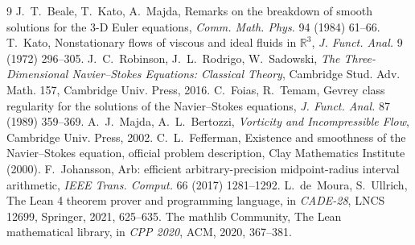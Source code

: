 \documentclass[11pt]{article}
\newcommand{\R}{\mathbb{R}}
\theoremstyle{remark}
\begin{document}
\begin{thebibliography}{9}
 J.~T.~Beale, T.~Kato, A.~Majda, Remarks on the breakdown of smooth solutions for the 3-D Euler
equations, \emph{Comm. Math. Phys.} 94 (1984) 61--66.
 T.~Kato, Nonstationary flows of viscous and ideal fluids in $\R^3$, \emph{J. Funct. Anal.} 9 (1972)
296--305.
 J.~C.~Robinson, J.~L.~Rodrigo, W.~Sadowski, \emph{The Three-Dimensional Navier--Stokes Equations:
Classical Theory}, Cambridge Stud. Adv. Math. 157, Cambridge Univ. Press, 2016.
 C.~Foias, R.~Temam, Gevrey class regularity for the solutions of the Navier--Stokes equations,
\emph{J. Funct. Anal.} 87 (1989) 359--369.
 A.~J.~Majda, A.~L.~Bertozzi, \emph{Vorticity and Incompressible Flow}, Cambridge Univ.
Press, 2002.
 C.~L.~Fefferman, Existence and smoothness of the Navier--Stokes equation, official problem
description, Clay Mathematics Institute (2000).
 F.~Johansson, Arb: efficient arbitrary-precision midpoint-radius interval arithmetic, \emph{IEEE
Trans. Comput.} 66 (2017) 1281--1292.
 L.~de~Moura, S.~Ullrich, The Lean 4 theorem prover and programming language, in \emph{CADE-28}, LNCS
12699, Springer, 2021, 625--635.
 The mathlib Community, The Lean mathematical library, in \emph{CPP 2020}, ACM, 2020, 367--381.
\end{thebibliography}
\end{document}
